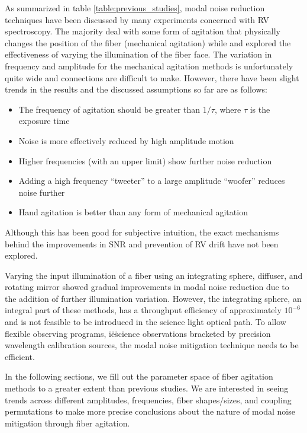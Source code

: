 \documentclass[twocolumn]{emulateapj}
\begin{document}
As summarized in table \ref{table:previous_studies}, modal noise reduction techniques have been discussed by many experiments concerned with RV spectroscopy. The majority deal with some form of agitation that physically changes the position of the fiber (mechanical agitation) while \citet{Mahadevan2014} and \citet{Halverson2014} explored the effectiveness of varying the illumination of the fiber face. The variation in frequency and amplitude for the mechanical agitation methods is unfortunately quite wide and connections are difficult to make. However, there have been slight trends in the results and the discussed assumptions so far are as follows:
\begin{itemize}
\item The frequency of agitation should be greater than $1/\tau$, where $\tau$ is the exposure time \citep{Baudrand2001}
\item Noise is more effectively reduced by high amplitude motion \citep{Lemke2011, McCoy2012}
\item Higher frequencies (with an upper limit) show further noise reduction \citep{Lemke2011}
\item Adding a high frequency ``tweeter'' to a large amplitude ``woofer'' reduces noise further \citep{Plavchan2013}
\item Hand agitation is better than any form of mechanical agitation \citep{Lemke2011, McCoy2012, Mahadevan2014, Roy2014}
\end{itemize}
Although this has been good for subjective intuition, the exact mechanisms behind the improvements in SNR and prevention of RV drift have not been explored.

Varying the input illumination of a fiber using an integrating sphere, diffuser, and rotating mirror showed gradual improvements in modal noise reduction due to the addition of further illumination variation. However, the integrating sphere, an integral part of these methods, has a throughput efficiency of approximately $10^{-6}$ and is not feasible to be introduced in the science light optical path. To allow flexible observing programs, i\.e\. science observations bracketed by precision wavelength calibration sources, the modal noise mitigation technique needs to be efficient.

In the following sections, we fill out the parameter space of fiber agitation methods to a greater extent than previous studies. We are interested in seeing trends across different amplitudes, frequencies, fiber shapes/sizes, and coupling permutations to make more precise conclusions about the nature of modal noise mitigation through fiber agitation.
\end{document}
